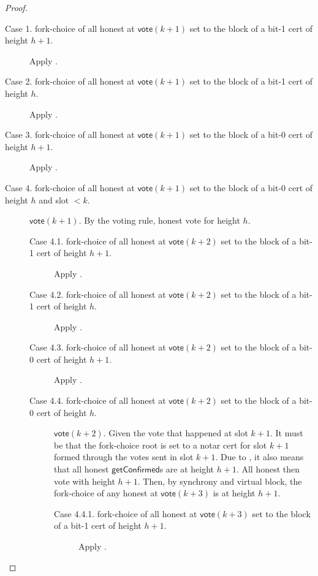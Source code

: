 \ifx\litemode\undefined\documentclass{article}\fi
\newcommand{\vote}{\mathsf{vote}}
\newcommand{\getConfirmed}{\textsf{getConfirmed}\xspace}
\theoremstyle{plain}
\theoremstyle{definition}
\theoremstyle{remark}
\begin{document}
\begin{proof}
{ 
\begin{description}
  \item[Case 1. fork-choice of all honest at $\vote(k+1)$ set to the block of a bit-1 cert of height $h+1$.] 
  Apply .

  \item[Case 2. fork-choice of all honest at $\vote(k+1)$ set to the block of a bit-1 cert of height $h$.] 
  Apply .


  \item[Case 3. fork-choice of all honest at $\vote(k+1)$ set to the block of a bit-0 cert of height $h+1$.] 
  Apply .

  \item[Case 4. fork-choice of all honest at $\vote(k+1)$ set to the block of a bit-0 cert of height $h$ and slot $<k$.]
  $\vote(k+1)$. By the voting rule, honest vote for height $h$.

  \begin{description}
    \item[Case 4.1. fork-choice of all honest at $\vote(k+2)$ set to the block of a bit-1 cert of height $h+1$.] 
    Apply .

    \item[Case 4.2. fork-choice of all honest at $\vote(k+2)$ set to the block of a bit-1 cert of height $h$.] 
    Apply .


    \item[Case 4.3. fork-choice of all honest at $\vote(k+2)$ set to the block of a bit-0 cert of height $h+1$.] 
    Apply .

    \item[Case 4.4. fork-choice of all honest at $\vote(k+2)$ set to the block of a bit-0 cert of height $h$.]
    $\vote(k+2)$.
    Given the vote that happened at slot $k+1$. It must be that the fork-choice root is set to a notar cert for slot $k+1$ formed through the votes sent in slot $k+1$.
    Due to , it also means that all honest $\getConfirmed$s are at height $h+1$.
    All honest then vote with height $h+1$.
    Then, by synchrony and virtual block, the fork-choice of any honest at $\vote(k+3)$ is at height $h+1$.


    \begin{description}
      \item[Case 4.4.1. fork-choice of all honest at $\vote(k+3)$ set to the block of a bit-1 cert of height $h+1$.] 
      Apply .



\end{description}
\end{description}
\end{description}}
\end{proof}
\end{document}
